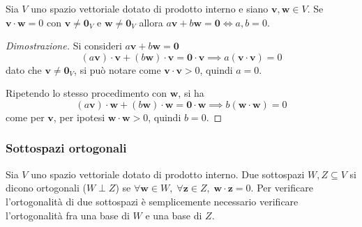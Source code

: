     \begin{theorem}
        Sia $V$ uno spazio vettoriale dotato di prodotto interno e siano $\mathbf{v}, \mathbf{w} \in V$. Se $\mathbf{v} \cdot \mathbf{w} = 0$ con $\mathbf{v} \neq \mathbf{0}_V$ e $\mathbf{w} \neq \mathbf{0}_V$ allora $a \mathbf{v} + b \mathbf{w} = \mathbf{0} \iff a, b = 0$.
    \end{theorem}

    \begin{proof}[Dimostrazione]
        Si consideri $a \mathbf{v} + b \mathbf{w} = \mathbf{0}$
        \[
            (a \mathbf{v}) \cdot \mathbf{v} + (b \mathbf{w}) \cdot \mathbf{v} = \mathbf{0} \cdot \mathbf{v} \implies a (\mathbf{v} \cdot \mathbf{v}) = 0
        \]
        dato che $\mathbf{v} \neq \mathbf{0}_V$, si può notare come $\mathbf{v} \cdot \mathbf{v} > 0$, quindi $a = 0$.

        \vspace{5pt}
        Ripetendo lo stesso procedimento con $\mathbf{w}$, si ha
        \[
            (a \mathbf{v}) \cdot \mathbf{w} + (b \mathbf{w}) \cdot \mathbf{w} = \mathbf{0} \cdot \mathbf{w} \implies b (\mathbf{w} \cdot \mathbf{w}) = 0
        \]
        come per $\mathbf{v}$, per ipotesi $\mathbf{w} \cdot \mathbf{w} > 0$, quindi $b = 0$.

    \end{proof}

    \vspace{10pt}
    \subsubsection{Sottospazi ortogonali} \label{subsubsec:vsorthogonal}
    Sia $V$ uno spazio vettoriale dotato di prodotto interno. Due sottospazi $W, Z \subseteq V$ si dicono ortogonali ($W \perp Z$) se $\forall \mathbf{w} \in W, \; \forall \mathbf{z} \in Z, \; \mathbf{w} \cdot \mathbf{z} = 0$.
    Per verificare l'ortogonalità di due sottospazi è semplicemente necessario verificare l'ortogonalità fra una base di $W$ e una base di $Z$.

